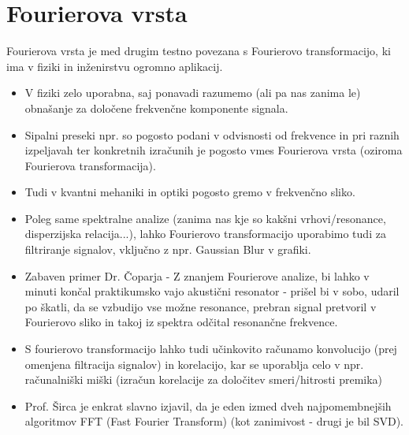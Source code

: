 \documentclass[12pt]{article}
\begin{document}
\section*{Fourierova vrsta}
Fourierova vrsta je med drugim testno povezana s Fourierovo transformacijo, ki ima v fiziki in inženirstvu ogromno aplikacij.
\begin{itemize}[leftmargin=1.5em]
    \item V fiziki zelo uporabna, saj ponavadi razumemo (ali pa nas zanima le) obnašanje za določene frekvenčne komponente signala.
    \item Sipalni preseki npr. so pogosto podani v odvisnosti od frekvence in pri raznih izpeljavah ter konkretnih izračunih je pogosto vmes Fourierova vrsta (oziroma Fourierova transformacija).
    \item Tudi v kvantni mehaniki in optiki pogosto gremo v frekvenčno sliko.
    \item Poleg same spektralne analize (zanima nas kje so kakšni vrhovi/resonance, disperzijska relacija...), lahko Fourierovo transformacijo uporabimo tudi za filtriranje signalov, vključno z npr. Gaussian Blur v grafiki.
    \item Zabaven primer Dr. Čoparja - Z znanjem Fourierove analize, bi lahko v minuti končal praktikumsko vajo akustični resonator - prišel bi v sobo, udaril po škatli, da se vzbudijo vse možne resonance, prebran signal pretvoril v Fourierovo sliko in takoj iz spektra odčital resonančne frekvence.
    \item S fourierovo transformacijo lahko tudi učinkovito računamo konvolucijo (prej omenjena filtracija signalov) in korelacijo, kar se uporablja celo v npr. računalniški miški (izračun korelacije za določitev smeri/hitrosti premika)
    \item Prof. Širca je enkrat slavno izjavil, da je eden izmed dveh najpomembnejših algoritmov FFT (Fast Fourier Transform)   (kot zanimivost - drugi je bil SVD).
\end{itemize}
\end{document}
